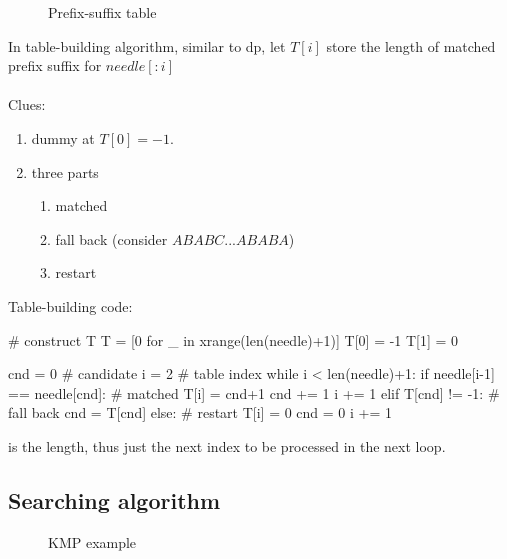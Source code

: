 \begin{figure}[hbtp]
\centering
{}
\caption{Prefix-suffix table}
\label{fig:kmp_table}
\end{figure}
In table-building algorithm, similar to dp, let $T[i]$ store the length of matched prefix suffix for $needle[:i]$\\
\\
Clues:
\begin{enumerate}
\item dummy at $T[0]=-1$.
\item three parts
\begin{enumerate}
\item matched
\item fall back (consider $ABABC...ABABA$)
\item restart 
\end{enumerate}
\end{enumerate}
Table-building code:
\begin{python}
# construct T
T = [0 for _ in xrange(len(needle)+1)]
T[0] = -1
T[1] = 0

cnd = 0  # candidate 
i = 2  # table index
while i < len(needle)+1:
    if needle[i-1] == needle[cnd]:  # matched
        T[i] = cnd+1
        cnd += 1
        i += 1
    elif T[cnd] != -1:  # fall back 
        cnd = T[cnd]
    else:  # restart 
        T[i] = 0
        cnd = 0
        i += 1
\end{python}

 is the length, thus just the next index to be processed in the next loop. 
\subsection{Searching algorithm}
\begin{figure}[]
\centering
{}
\caption{KMP example}
\label{fig:kmp_presuffix}
\end{figure}

